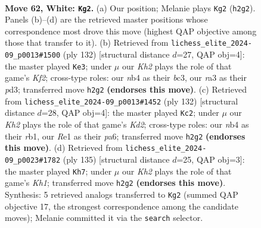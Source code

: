 \documentclass[11pt]{article}
\begin{document}
\clearpage

\begin{figure}[p]\centering
\begin{subfigure}{0.46\textwidth}\centering
\resizebox{\linewidth}{!}{%
\newchessgame
\chessboard[
  setfen={3R4/kp5p/6pP/p4p2/1n3P2/r7/7K/4R3 w - - 11 62},
  showmover=false,
  pgfstyle=straightmove, color=movearrow, markmove={h2-g2}
]}
\caption{}
\end{subfigure}\hfill
\begin{subfigure}{0.46\textwidth}\centering
\resizebox{\linewidth}{!}{%
\newchessgame
\chessboard[
  setfen={8/7p/7P/N2k2p1/1p2p1P1/2bp4/5K2/8 w - - 0 67},
  showmover=false,
  pgfstyle=straightmove, color=movearrow, markmove={f2-e3}
]}
\caption{}
\end{subfigure}
\\[4pt]
\begin{subfigure}{0.46\textwidth}\centering
\resizebox{\linewidth}{!}{%
\newchessgame
\chessboard[
  setfen={2R5/5p2/p3p3/2P1Ppk1/8/8/3K4/1r6 w - - 3 67},
  showmover=false,
  pgfstyle=straightmove, color=movearrow, markmove={d2-c2}
]}
\caption{}
\end{subfigure}\hfill
\begin{subfigure}{0.46\textwidth}\centering
\resizebox{\linewidth}{!}{%
\newchessgame
\chessboard[
  setfen={7k/4N3/1p3P1P/1P4K1/p7/P7/1P6/8 b - - 0 68},
  showmover=false,
  pgfstyle=straightmove, color=movearrow, markmove={h8-h7}
]}
\caption{}
\end{subfigure}
\caption{\textbf{Move 62, White: \texttt{Kg2}.} (a) Our position; Melanie plays \texttt{Kg2} (\texttt{h2g2}). Panels (b)--(d) are the retrieved master positions whose correspondence most drove this move (highest QAP objective among those that transfer to it). (b) Retrieved from \texttt{lichess\_elite\_2024-09\_p0013\#1500} (ply 132) [structural distance $d$=27, QAP obj=4]: the master played \texttt{Ke3}; under $\mu$ our \emph{Kh2} plays the role of that game's \emph{Kf2}; cross-type roles: our \emph{n}b4 as their \emph{b}c3, our \emph{r}a3 as their \emph{p}d3; transferred move \texttt{h2g2} \textbf{(endorses this move)}. (c) Retrieved from \texttt{lichess\_elite\_2024-09\_p0013\#1452} (ply 132) [structural distance $d$=28, QAP obj=4]: the master played \texttt{Kc2}; under $\mu$ our \emph{Kh2} plays the role of that game's \emph{Kd2}; cross-type roles: our \emph{n}b4 as their \emph{r}b1, our \emph{R}e1 as their \emph{p}a6; transferred move \texttt{h2g2} \textbf{(endorses this move)}. (d) Retrieved from \texttt{lichess\_elite\_2024-09\_p0023\#1782} (ply 135) [structural distance $d$=25, QAP obj=3]: the master played \texttt{Kh7}; under $\mu$ our \emph{Kh2} plays the role of that game's \emph{Kh1}; transferred move \texttt{h2g2} \textbf{(endorses this move)}. Synthesis: 5 retrieved analogs transferred to \texttt{Kg2} (summed QAP objective 17, the strongest correspondence among the candidate moves); Melanie committed it via the \texttt{search} selector.}
\label{fig:thought-m122}
\end{figure}
\end{document}
